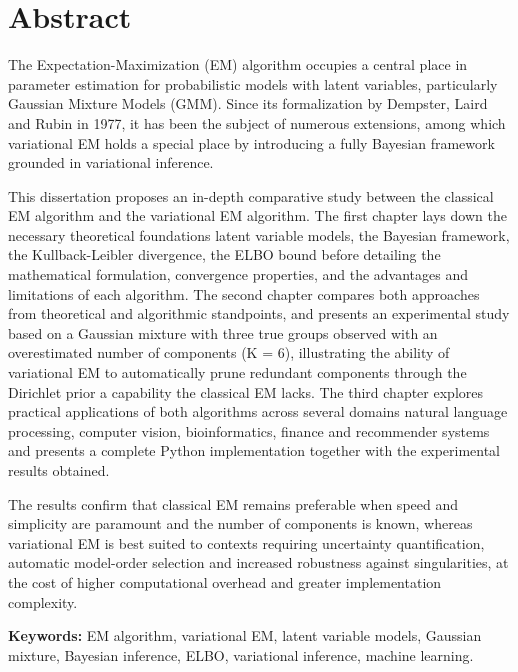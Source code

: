 \chapter*{Abstract}
The Expectation-Maximization (EM) algorithm occupies a central place in parameter estimation for probabilistic models with latent variables, particularly Gaussian Mixture Models (GMM). Since its formalization by Dempster, Laird and Rubin in 1977, it has been the subject of numerous extensions, among which variational EM holds a special place by introducing a fully Bayesian framework grounded in variational inference.

This dissertation proposes an in-depth comparative study between the classical EM algorithm and the variational EM algorithm. The first chapter lays down the necessary theoretical foundations  latent variable models, the Bayesian framework, the Kullback-Leibler divergence, the ELBO bound  before detailing the mathematical formulation, convergence properties, and the advantages and limitations of each algorithm. The second chapter compares both approaches from theoretical and algorithmic standpoints, and presents an experimental study based on a Gaussian mixture with three true groups observed with an overestimated number of components (K = 6), illustrating the ability of variational EM to automatically prune redundant components through the Dirichlet prior  a capability the classical EM lacks. The third chapter explores practical applications of both algorithms across several domains  natural language processing, computer vision, bioinformatics, finance and recommender systems  and presents a complete Python implementation together with the experimental results obtained.

The results confirm that classical EM remains preferable when speed and simplicity are paramount and the number of components is known, whereas variational EM is best suited to contexts requiring uncertainty quantification, automatic model-order selection and increased robustness against singularities, at the cost of higher computational overhead and greater implementation complexity.

\textbf{Keywords: }EM algorithm, variational EM, latent variable models, Gaussian mixture, Bayesian inference, ELBO, variational inference, machine learning.


